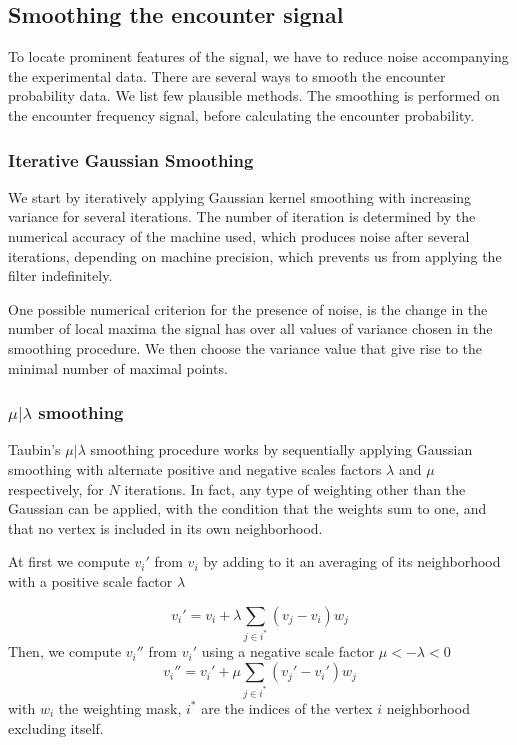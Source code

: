 \documentclass[12pt]{article}
\begin{document}
\subsection{Smoothing the encounter signal}
To locate prominent features of the signal, we have to reduce noise accompanying the experimental data. There are several ways to smooth the encounter probability data. We list few plausible methods.
The smoothing is performed on the encounter frequency signal, before calculating the encounter probability.

\subsubsection{Iterative Gaussian Smoothing}
We start by iteratively applying Gaussian kernel smoothing with increasing variance for several iterations. The number of iteration is determined by the numerical accuracy of the machine used, which produces noise after several iterations, depending on machine precision, which prevents us from applying the filter indefinitely. 

One possible numerical criterion for the presence of noise, is the change in the number of local maxima the signal has over all values of variance chosen in the smoothing procedure. We then choose the variance value that give rise to the minimal number of maximal points. 

\subsubsection{$\mu|\lambda$ smoothing}\label{subsubsection_muLambdaSmoothing} 
Taubin's $\mu|\lambda$ smoothing procedure \cite{taubin1995curve}works by sequentially applying Gaussian smoothing with alternate positive and negative scales factors $\lambda$ and $\mu$ respectively, for $N$ iterations. In fact, any type of weighting other than the Gaussian can be applied, with the condition that the weights sum to one, and that no vertex is included in its own neighborhood. 

At first we compute $v_i'$ from $v_i$ by adding to it an averaging of its neighborhood with a positive scale factor $\lambda$ 

\begin{equation*}
v_i' = v_i+\lambda\sum_{j\in i^*} (v_j-v_i)w_j
\end{equation*}
Then, we compute $v_i''$ from $v_i'$ using a negative scale factor $\mu<-\lambda<0$
\begin{equation*}
v_i'' = v_i'+\mu\sum_{j\in i^*} (v_j'-v_i')w_j
\end{equation*}
with $w_i$ the weighting mask, $i^*$ are the indices of the vertex $i$ neighborhood excluding itself. 
\end{document}
